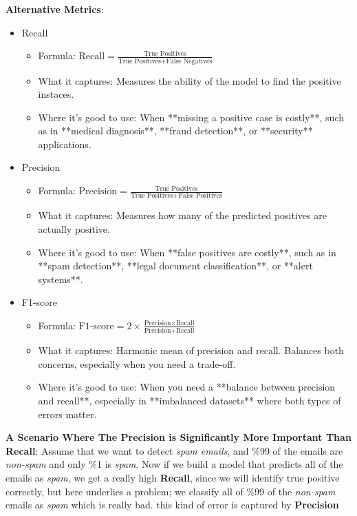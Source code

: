 \documentclass[a4paper,12pt]{article}
\begin{document}
\noindent\textbf{Alternative Metrics}:
\begin{itemize}
    \item Recall
    \begin{itemize}
        \item Formula: $\text{Recall} = \frac{\text{True Positives}}{\text{True Positives} + \text{False Negatives}}$
        \item What it captures: Measures the ability of the model to find the positive instaces. 
        \item Where it's good to use: When **missing a positive case is costly**, such as in **medical diagnosis**, **fraud detection**, or **security** applications.
    \end{itemize}
    \item Precision
    \begin{itemize}
        \item Formula: $\text{Precision} = \frac{\text{True Positives}}{\text{True Positives} + \text{False Positives}}$
        \item What it captures: Measures how many of the predicted positives are actually positive.
        \item Where it's good to use: When **false positives are costly**, such as in **spam detection**, **legal document classification**, or **alert systems**.
    \end{itemize}
    \item F1-score
    \begin{itemize}
        \item Formula: $\text{F1-score} = 2 \times \frac{\text{Precision} \times \text{Recall}}{\text{Precision} + \text{Recall}}$
        \item What it captures: Harmonic mean of precision and recall. Balances both concerns, especially when you need a trade-off.
        \item Where it's good to use: When you need a **balance between precision and recall**, especially in **imbalanced datasets** where both types of errors matter.
    \end{itemize}
\end{itemize}

\noindent\textbf{A Scenario Where The Precision is Significantly More Important Than Recall}:
Assume that we want to detect \textit{spam emails}, and \%99 of the emails are \textit{non-spam} and only \%1 is \textit{spam}. Now if we build a model that predicts all of the emails as 
\textit{spam}, we get a really high \textbf{Recall}, since we will identify true positive correctly, but here underlies a problem; we classify all of \%99 of the \textit{non-spam} emails as \textit{spam}
which is really bad. this kind of error is captured by \textbf{Precision} 
\end{document}
